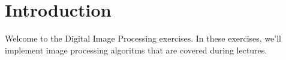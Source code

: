 \documentclass[12pt]{article}
\begin{document}
\section*{Introduction}

Welcome to the Digital Image Processing exercises.%
In these exercises, we'll implement image processing algoritms that are covered during lectures.
\end{document}
